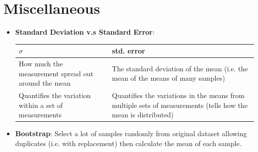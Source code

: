 \documentclass[11pt, twocolumn]{article}
\begin{document}
\section{Miscellaneous}
\begin{itemize}
\item \textbf{Standard Deviation v.s Standard Error}:
\centering
\begin{tabular}{|>{\centering\arraybackslash}m{3cm}|>{\centering\arraybackslash}m{4cm}|} 
 \hline
 $\sigma$ & std. error \\ 
 \hline
 How much the measurement spread out around the mean & The standard deviation of the mean (i.e. the mean of the means of many samples)  \\
 \hline
 Quantifies the variation within a set of measurements & Quantifies the variations in the means from multiple sets of measurements (tells how the mean is distributed) \\ 
 \hline
\end{tabular}
\end{itemize}

\begin{itemize}
\item \textbf{Bootstrap}:
Select a lot of samples randomly from original dataset allowing duplicates (i.e. with replacement) then calculate the mean of each sample.
\end{itemize}
\end{document}
